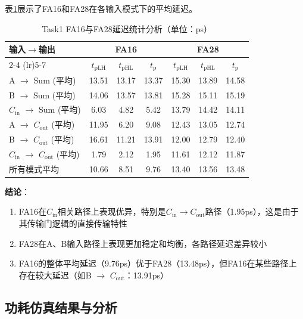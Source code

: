 \documentclass[UTF8,12pt,a4paper]{ctexart}
\begin{document}
表\ref{tab:task1_delay_summary}展示了FA16和FA28在各输入模式下的平均延迟。

\begin{table}[htbp]
    \centering
    \caption{Task1 FA16与FA28延迟统计分析（单位：ps）}
    \label{tab:task1_delay_summary}
    \begin{tabular}{lcccccc}
    \toprule
    \multirow{2}{*}{输入$\rightarrow$输出} & \multicolumn{3}{c}{FA16} & \multicolumn{3}{c}{FA28} \\
    \cmidrule(lr){2-4} \cmidrule(lr){5-7}
     & $t_{\text{pLH}}$ & $t_{\text{pHL}}$ & $t_{\text{p}}$ & $t_{\text{pLH}}$ & $t_{\text{pHL}}$ & $t_{\text{p}}$ \\
    \midrule
    A $\rightarrow$ Sum (平均) & 13.51 & 13.17 & 13.37 & 15.30 & 13.89 & 14.58 \\
    B $\rightarrow$ Sum (平均) & 14.06 & 13.57 & 13.81 & 15.28 & 15.11 & 15.19 \\
    $C_{\text{in}}$ $\rightarrow$ Sum (平均) & 6.03 & 4.82 & 5.42 & 13.79 & 14.42 & 14.11 \\
    A $\rightarrow$ $C_{\text{out}}$ (平均) & 11.95 & 6.20 & 9.08 & 12.43 & 13.05 & 12.74 \\
    B $\rightarrow$ $C_{\text{out}}$ (平均) & 16.61 & 11.21 & 13.91 & 12.00 & 12.79 & 12.40 \\
    $C_{\text{in}}$ $\rightarrow$ $C_{\text{out}}$ (平均) & 1.79 & 2.12 & 1.95 & 11.61 & 12.12 & 11.87 \\
    \midrule
    所有模式平均 & 10.66 & 8.51 & 9.76 & 13.40 & 13.56 & 13.48 \\
    \bottomrule
    \end{tabular}
\end{table}

\textbf{结论}：
\begin{enumerate}
    \item FA16在$C_{\text{in}}$相关路径上表现优异，特别是$C_{\text{in}} \rightarrow C_{\text{out}}$路径（1.95ps），这是由于其传输门逻辑的直接传输特性
    \item FA28在A、B输入路径上表现更加稳定和均衡，各路径延迟差异较小
    \item FA16的整体平均延迟（9.76ps）优于FA28（13.48ps），但FA16在某些路径上存在较大延迟（如B $\rightarrow$ $C_{\text{out}}$：13.91ps）
\end{enumerate}

\subsection{功耗仿真结果与分析}
\end{document}

